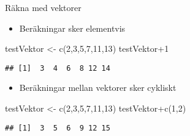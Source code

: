 \documentclass[
  10pt,
  ignorenonframetext,
]{beamer}
\newenvironment{Shaded}{\begin{snugshade}}{\end{snugshade}}
\newcommand{\DecValTok}[1]{\textcolor[rgb]{0.00,0.00,0.81}{#1}}
\newcommand{\FunctionTok}[1]{\textcolor[rgb]{0.00,0.00,0.00}{#1}}
\newcommand{\NormalTok}[1]{#1}
\newcommand{\OtherTok}[1]{\textcolor[rgb]{0.56,0.35,0.01}{#1}}
\newcommand{\SpecialCharTok}[1]{\textcolor[rgb]{0.00,0.00,0.00}{#1}}
\providecommand{\tightlist}{%
  \setlength{\itemsep}{0pt}\setlength{\parskip}{0pt}}
\begin{document}
\begin{frame}[fragile]{Räkna med vektorer}
\protect\hypertarget{ruxe4kna-med-vektorer}{}
\begin{itemize}
\tightlist
\item
  Beräkningar sker elementvis
\end{itemize}

\begin{Shaded}
\begin{Highlighting}[]
\NormalTok{testVektor }\OtherTok{\textless{}{-}} \FunctionTok{c}\NormalTok{(}\DecValTok{2}\NormalTok{,}\DecValTok{3}\NormalTok{,}\DecValTok{5}\NormalTok{,}\DecValTok{7}\NormalTok{,}\DecValTok{11}\NormalTok{,}\DecValTok{13}\NormalTok{)}
\NormalTok{testVektor}\SpecialCharTok{+}\DecValTok{1}
\end{Highlighting}
\end{Shaded}

\begin{verbatim}
## [1]  3  4  6  8 12 14
\end{verbatim}

\begin{itemize}
\tightlist
\item
  Beräkningar mellan vektorer sker cykliskt
\end{itemize}

\begin{Shaded}
\begin{Highlighting}[]
\NormalTok{testVektor }\OtherTok{\textless{}{-}} \FunctionTok{c}\NormalTok{(}\DecValTok{2}\NormalTok{,}\DecValTok{3}\NormalTok{,}\DecValTok{5}\NormalTok{,}\DecValTok{7}\NormalTok{,}\DecValTok{11}\NormalTok{,}\DecValTok{13}\NormalTok{)}
\NormalTok{testVektor}\SpecialCharTok{+}\FunctionTok{c}\NormalTok{(}\DecValTok{1}\NormalTok{,}\DecValTok{2}\NormalTok{)}
\end{Highlighting}
\end{Shaded}

\begin{verbatim}
## [1]  3  5  6  9 12 15
\end{verbatim}
\end{frame}

\end{document}
